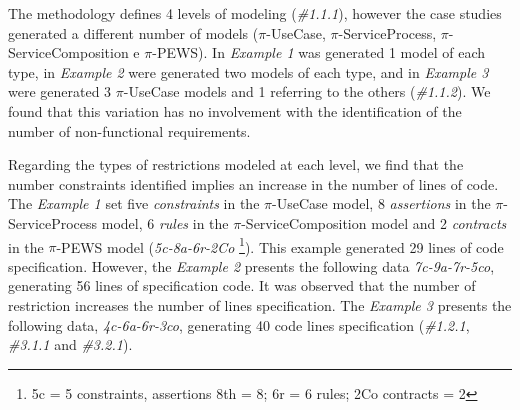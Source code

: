 The methodology defines 4 levels of modeling (\textit{\#1.1.1}), however the
case studies generated a different number of models ($\pi$-UseCase,
$\pi$-ServiceProcess, $\pi$-ServiceComposition e $\pi$-PEWS). In \textit{Example
1} was generated 1 model of each type, in \textit{Example 2} were generated two
models of each type, and in \textit{Example 3} were generated 3 $\pi$-UseCase
models and 1 referring to the others (\textit{\#1.1.2}). We found that this
variation has no involvement with the identification of the number of non-functional
requirements.


Regarding the types of restrictions modeled at each level, we find that
the number constraints identified implies an increase in the number of
lines of code. The  \textit{Example 1} set five \textit{constraints} in the
$\pi$-UseCase model, 8 \textit{assertions} in the $\pi$-ServiceProcess model, 6
\textit{rules} in the $\pi$-ServiceComposition model and 2 \textit{contracts} in
the $\pi$-PEWS model (\textit{5c-8a-6r-2Co} \footnote{5c =
5 constraints, assertions 8th = 8; 6r = 6 rules; 2Co contracts = 2}). This
example generated 29 lines of code specification. However, the \textit{Example
2} presents the following data \textit{7c-9a-7r-5co}, generating 56 lines of
specification code. It was observed that the number of restriction increases the
number of lines specification. The \textit{Example 3} presents the following
data, \textit{4c-6a-6r-3co}, generating 40 code lines specification
(\textit{\#1.2.1}, \textit{\#3.1.1} and \textit{\#3.2.1}).



